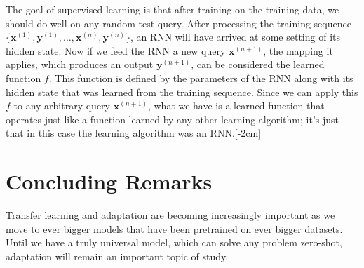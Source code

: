 The goal of supervised learning is that after training on the training data, we should do well on any random test query. After processing the training sequence $\{\mathbf{x}^{(1)}, \mathbf{y}^{(1)}, \ldots, \mathbf{x}^{(n)}, \mathbf{y}^{(n)}\}$, an RNN will have arrived at some setting of its hidden state. Now if we feed the RNN a new query $\mathbf{x}^{(n+1)}$, the mapping it applies, which produces an output $\mathbf{y}^{(n+1)}$, can be considered the learned function $f$. This function is defined by the parameters of the RNN along with its hidden state that was learned from the training sequence. Since we can apply this $f$ to any arbitrary query $\mathbf{x}^{(n+1)}$, what we have is a learned function that operates just like a function learned by any other learning algorithm; it's just that in this case the learning algorithm was an RNN.[-2cm]










\section{Concluding Remarks}

Transfer learning and adaptation are becoming increasingly important as we move to ever bigger models that have been pretrained on ever bigger datasets. Until we have a truly universal model, which can solve any problem zero-shot, adaptation will remain an important topic of study.
